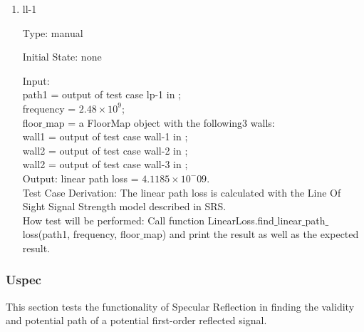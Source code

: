 \documentclass[12pt, titlepage]{article}
\begin{document}
\begin{enumerate}

\item{ll-1\\}

Type: manual
					
Initial State: none
					
Input: \\
path1 = output of test case lp-1 in ;\\
frequency = $2.48\times10^9$;\\
floor$\_$map = a FloorMap object with the following3 walls:\\
\indent wall1 = output of test case wall-1 in ;\\
\indent wall2 = output of test case wall-2 in ;\\
\indent wall2 = output of test case wall-3 in ;\\
					
Output: linear path loss = $4.1185\times10^-09$.\\

Test Case Derivation: The linear path loss is calculated with the Line Of Sight Signal Strength model described in SRS.\\

How test will be performed: Call function LinearLoss.find$\_$linear$\_$path$\_$loss(path1, frequency, floor$\_$map) and print the result as well as the expected result.
    
\end{enumerate}

\subsubsection{Uspec}
\label{specular}

This section tests the functionality of Specular Reflection in finding the validity and potential path of a potential first-order reflected signal.
\end{document}
